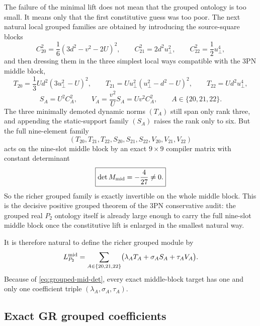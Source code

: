\documentclass[11pt]{article}
\begin{document}
The failure of the minimal lift does not mean that the grouped ontology is too
small.  It means only that the first constitutive guess was too poor.  The next
natural local grouped families are obtained by introducing the source-square
blocks
\begin{equation}
C_{20}^2=\frac16(3d^2-v^2-2U)^2,
\qquad
C_{21}^2=2d^2u_\perp^2,
\qquad
C_{22}^2=\frac12u_\perp^4,
\label{eq:grouped-C-squares}
\end{equation}
and then dressing them in the three simplest local ways compatible with the
$3$PN middle block,
\begin{equation}
T_{20}=\frac13Ud^2(3u_\perp^2-U)^2,
\qquad
T_{21}=Uu_\perp^2(u_\perp^2-d^2-U)^2,
\qquad
T_{22}=Ud^2u_\perp^4,
\label{eq:grouped-T-family}
\end{equation}
\begin{equation}
S_A=U^2C_A^2,
\qquad
V_A=\frac{v^2}{U}S_A=Uv^2C_A^2,
\qquad
A\in\{20,21,22\}.
\label{eq:grouped-SV-family}
\end{equation}
The three minimally demoted dynamic norms \((T_A)\) still span only rank three,
and appending the static-support family \((S_A)\) raises the rank only to six.
But the full nine-element family
\[
(T_{20},T_{21},T_{22},S_{20},S_{21},S_{22},V_{20},V_{21},V_{22})
\]
acts on the nine-slot middle block by an exact $9\times 9$ compiler matrix with
constant determinant
\begin{equation}
\boxed{\det M_{\rm mid}=-\frac4{27}\neq 0.}
\label{eq:grouped-mid-det}
\end{equation}
So the richer grouped family is exactly invertible on the whole middle block.
This is the decisive positive grouped theorem of the $3$PN conservative audit:
the grouped real $P_2$ ontology itself is already large enough to carry the full
nine-slot middle block once the constitutive lift is enlarged in the smallest
natural way.

It is therefore natural to define the richer grouped module by
\begin{equation}
L_{P_2}^{\rm mid}
=
\sum_{A\in\{20,21,22\}}
\bigl(\lambda_A T_A+\sigma_A S_A+\tau_A V_A\bigr).
\label{eq:grouped-mid-ansatz}
\end{equation}
Because of \eqref{eq:grouped-mid-det}, every exact middle-block target has one
and only one coefficient triple
\((\lambda_A,\sigma_A,\tau_A)\).

\subsection{Exact GR grouped coefficients}
\label{sec:grouped-gr-coeffs}
\end{document}
